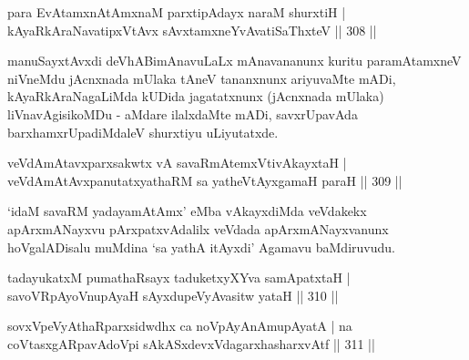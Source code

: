 \begin{shl}
para EvA\s \s tamxnA\s \s tAmxnaM parxtipAdayx naraM shurxtiH |
kAyaRkAraNavatipxVtAvx sAvxtamxneYvAvatiSaThxteV \hfill || 308 ||
\end{shl}

\begin{artha}
manuSayxtAvxdi deVhABimAnavuLaLx mAnavananunx kuritu paramAtamxneV niVneMdu jAcnxnada mUlaka tAneV tananxnunx ariyuvaMte mADi, kAyaRkAraNagaLiMda kUDida jagatatxnunx (jAcnxnada mUlaka) liVnavAgisikoMDu - aMdare ilalxdaMte mADi, savxrUpavAda barxhamxrUpadiMdaleV shurxtiyu uLiyutatxde.
\end{artha}


\begin{shl}
veVdAmAtavxparxsakwtx vA savaRmAtemxVtivAkayxtaH |
veVdAmAtAvxpanutatxyathaRM sa yatheVtAyxgamaH paraH \hfill || 309 ||
\end{shl}

\begin{artha}
`idaM savaRM yadayamAtAmx' eMba vAkayxdiMda veVdakekx apArxmANayxvu pArxpatxvAdalilx veVdada apArxmANayxvanunx hoVgalADisalu muMdina `sa yathA itAyxdi' Agamavu baMdiruvudu.
\end{artha}

\begin{shl}
tadayukatxM pumathaRsayx taduketxyXYva samApatxtaH |
savoVRpAyoV\s nupAyaH sAyxdupeVyAvasitw yataH \hfill || 310 ||
\end{shl}
\begin{shl}
sovxVpeVyAthaRparxsidwdhx ca noVpAyAnAmupAyatA |
na coVtasxgARpavAdoV\s pi sAkASxdevxVdagarxhasharxvAtf \hfill || 311 ||
\end{shl}

